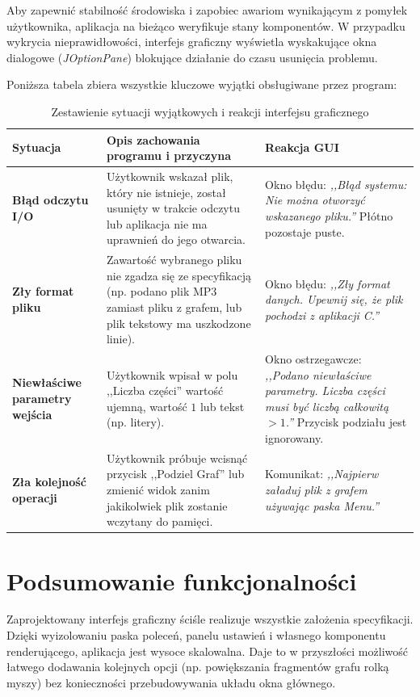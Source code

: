 \documentclass[12pt,a4paper]{article}
\begin{document}
Aby zapewnić stabilność środowiska i zapobiec awariom wynikającym z pomyłek użytkownika, aplikacja na bieżąco weryfikuje stany komponentów. W przypadku wykrycia nieprawidłowości, interfejs graficzny wyświetla wyskakujące okna dialogowe (\textit{JOptionPane}) blokujące działanie do czasu usunięcia problemu.

Poniższa tabela zbiera wszystkie kluczowe wyjątki obsługiwane przez program:

\vspace{0.5cm}
\begin{table}[h]
    \centering
    \renewcommand{\arraystretch}{1.5}
    \begin{tabularx}{\textwidth}{|p{3.5cm}|X|p{3.5cm}|}
    \hline
    \textbf{Sytuacja} & \textbf{Opis zachowania programu i przyczyna} & \textbf{Reakcja GUI} \\ \hline
    
    \textbf{Błąd odczytu I/O} & Użytkownik wskazał plik, który nie istnieje, został usunięty w trakcie odczytu lub aplikacja nie ma uprawnień do jego otwarcia. & Okno błędu: \textit{,,Błąd systemu: Nie można otworzyć wskazanego pliku.''} Płótno pozostaje puste. \\ \hline
    
    \textbf{Zły format pliku} & Zawartość wybranego pliku nie zgadza się ze specyfikacją (np. podano plik MP3 zamiast pliku z grafem, lub plik tekstowy ma uszkodzone linie). & Okno błędu: \textit{,,Zły format danych. Upewnij się, że plik pochodzi z aplikacji C.''} \\ \hline
    
    \textbf{Niewłaściwe parametry wejścia} & Użytkownik wpisał w polu ,,Liczba części'' wartość ujemną, wartość $1$ lub tekst (np. litery). & Okno ostrzegawcze: \textit{,,Podano niewłaściwe parametry. Liczba części musi być liczbą całkowitą $>1$.''} Przycisk podziału jest ignorowany. \\ \hline
    
    \textbf{Zła kolejność operacji} & Użytkownik próbuje wcisnąć przycisk ,,Podziel Graf'' lub zmienić widok zanim jakikolwiek plik zostanie wczytany do pamięci. & Komunikat: \textit{,,Najpierw załaduj plik z grafem używając paska Menu.''} \\ \hline
    
    \end{tabularx}
    \caption{Zestawienie sytuacji wyjątkowych i reakcji interfejsu graficznego}
\end{table}

\section{Podsumowanie funkcjonalności}
Zaprojektowany interfejs graficzny ściśle realizuje wszystkie założenia specyfikacji. Dzięki wyizolowaniu paska poleceń, panelu ustawień i własnego komponentu renderującego, aplikacja jest wysoce skalowalna. Daje to w przyszłości możliwość łatwego dodawania kolejnych opcji (np. powiększania fragmentów grafu rolką myszy) bez konieczności przebudowywania układu okna głównego.
\end{document}
